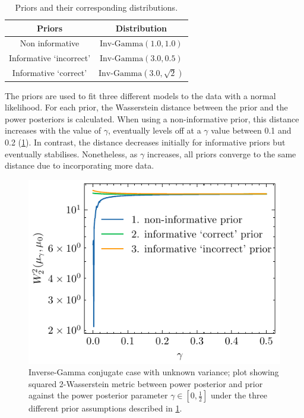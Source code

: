\documentclass[12pt]{article}
\begin{document}
\begin{table}[h!]
	\caption{Priors and their corresponding distributions.}
	\renewcommand{\arraystretch}{1.5}
	\centering
	\begin{tabular}{cc}
	\toprule
		Priors      & Distribution  \\
		\midrule
		Non informative    &  $\text{Inv-Gamma}(1.0, 1.0)$  \\
		Informative `incorrect'   & $\text{Inv-Gamma}(3.0, 0.5)$    \\
		Informative    `correct'  & $\text{Inv-Gamma}(3.0, \sqrt{2})$\\
		\bottomrule
	\end{tabular}
	\label{priors_invg}
\end{table}

The priors are used to fit three different models to the data with a normal likelihood. For each prior, the Wasserstein distance between the prior and the power posteriors is calculated. When using a non-informative prior, this distance increases with the value of $\gamma$, eventually levels off  at a $\gamma$ value between 0.1 and 0.2 (\cref{fig:ing_conju}). In contrast, the distance decreases initially for informative priors but eventually stabilises. Nonetheless, as $\gamma$ increases, all priors converge to the same distance due to incorporating more data.

\FloatBarrier
\begin{figure}[h]
\begin{center}
        \includegraphics{imgs/inv_gamma_wasserstein_distance.pdf}     
\end{center}
        \caption{Inverse-Gamma conjugate case with unknown variance; plot showing squared
2-Wasserstein metric between power posterior and prior against the
power posterior parameter $\gamma \in [0, \frac{1}{2}]$ under the three
different prior assumptions described in  \cref{priors_invg}.}
    \label{fig:ing_conju}
\end{figure}
\end{document}
